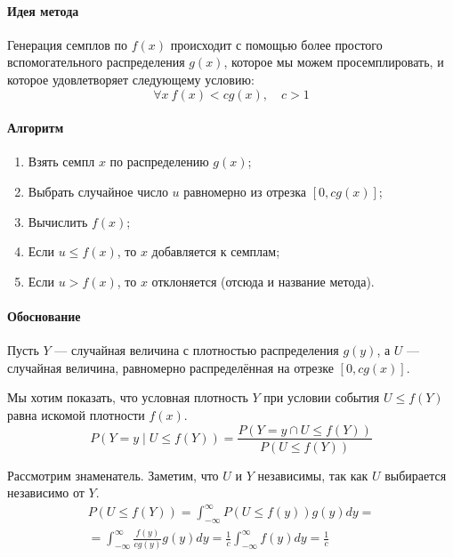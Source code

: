 \documentclass[a4paper,14pt]{extarticle}
\begin{document}
                \paragraph{Идея метода}
                    Генерация семплов по $f(x)$ происходит с помощью более простого вспомогательного распределения $g(x)$, которое мы можем просемплировать, и которое удовлетворяет следующему условию:
                    \[
                    \forall x \ f(x)<cg(x), \quad c > 1
                    \]
                
                \paragraph{Алгоритм}
                    \begin{enumerate}
                            \item Взять семпл $x$ по распределению $g(x)$;
                            \item Выбрать случайное число $u$ равномерно из отрезка $[0,cg(x)]$;
                            \item Вычислить $f(x)$;
                            \item Если $u \leq f(x)$, то $x$ добавляется к семплам;
                            \item Если $u > f(x)$, то $x$ отклоняется (отсюда и название метода).
                    \end{enumerate}
                
                \paragraph{Обоснование}
                    Пусть $Y$ — случайная величина с плотностью распределения $g(y)$, а $U$ — случайная величина, равномерно распределённая на отрезке $[0, cg(x)]$.
                    
                    Мы хотим показать, что условная плотность $Y$ при условии события $U \leq f(Y)$ равна искомой плотности $f(x)$.
                    \[
                    P(Y = y \mid U \leq f(Y)) =
                    \frac{P(Y = y \cap U \leq f(Y))}{P(U \leq f(Y))}
                    \]
                    
                    Рассмотрим знаменатель. Заметим, что $U$ и $Y$ независимы, так как $U$ выбирается независимо от $Y$.
                    \begin{gather*}
                            P(U \leq f(Y)) =
                            \int_{-\infty}^{\infty} P(U \leq f(y)) g(y) dy =\\
                            = \int_{-\infty}^{\infty} \frac{f(y)}{cg(y)} g(y) dy =
                            \frac{1}{c} \int_{-\infty}^{\infty} f(y) dy =
                            \frac{1}{c}
                    \end{gather*}
                    
\end{document}
